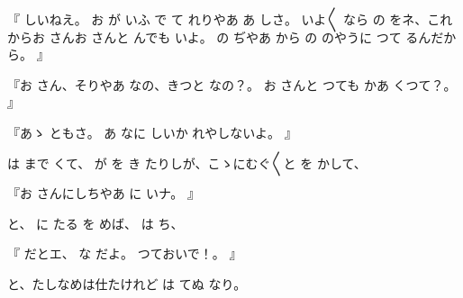 『
しいねえ。
お
が
いふ
で
て
れりやあ
あ
しさ。
いよ〳〵
なら
の
をネ、これからお
さんお
さんと
んでも
いよ。
の
ぢやあ
から
の
のやうに
つて
るんだから。
』

『お
さん、そりやあ
なの、きつと
なの？。
お
さんと
つても
かあ
くつて？。
』

『あゝ
ともさ。
あ
なに
しいか
れやしないよ。
』

は
まで
くて、
が
を
き
たりしが、こゝにむぐ〳〵と
を
かして、

『お
さんにしちやあ
に
いナ。
』

と、
に
たる
を
めば、
は
ち、

『
だとエ、
な
だよ。
つておいで！。
』

と、たしなめは仕たけれど
は
てぬ
なり。

